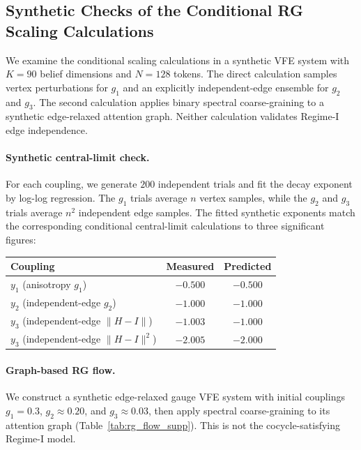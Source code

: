 \documentclass[twoside,11pt]{article}
\begin{document}
\subsection{Synthetic Checks of the Conditional RG Scaling Calculations}
\label{sec:rg_numerical_supp}

We examine the conditional scaling calculations in a synthetic VFE system with $K=90$ belief dimensions and $N=128$ tokens. The direct calculation samples vertex perturbations for $g_1$ and an explicitly independent-edge ensemble for $g_2$ and $g_3$. The second calculation applies binary spectral coarse-graining to a synthetic edge-relaxed attention graph. Neither calculation validates Regime-I edge independence.

\paragraph{Synthetic central-limit check.}
For each coupling, we generate $200$ independent trials and fit the decay exponent by log-log regression. The $g_1$ trials average $n$ vertex samples, while the $g_2$ and $g_3$ trials average $n^2$ independent edge samples. The fitted synthetic exponents match the corresponding conditional central-limit calculations to three significant figures:
\begin{center}
\begin{tabular}{lcc}
\toprule
\textbf{Coupling} & \textbf{Measured} & \textbf{Predicted} \\
\midrule
$y_1$ (anisotropy $g_1$) & $-0.500$ & $-0.500$ \\
$y_2$ (independent-edge $g_2$) & $-1.000$ & $-1.000$ \\
$y_3$ (independent-edge $\|H - I\|$) & $-1.003$ & $-1.000$ \\
$y_3$ (independent-edge $\|H - I\|^2$) & $-2.005$ & $-2.000$ \\
\bottomrule
\end{tabular}
\end{center}

\paragraph{Graph-based RG flow.}
We construct a synthetic edge-relaxed gauge VFE system with initial couplings $g_1=0.3$, $g_2\approx0.20$, and $g_3\approx0.03$, then apply spectral coarse-graining to its attention graph (Table~\ref{tab:rg_flow_supp}). This is not the cocycle-satisfying Regime-I model.
\end{document}
